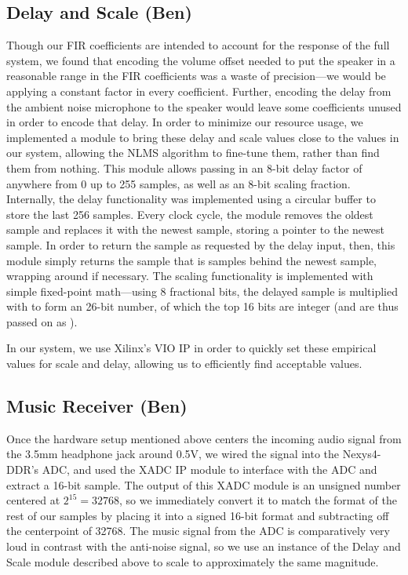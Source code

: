 \documentclass{fpgairpods}
\begin{document}
\subsection{Delay and Scale (Ben)}
Though our FIR coefficients are intended to account for the response of the full system, we found that encoding the volume offset needed to put the speaker in a reasonable range in the FIR coefficients was a waste of precision---we would be applying a constant factor in every coefficient. Further, encoding the delay from the ambient noise microphone to the speaker would leave some coefficients unused in order to encode that delay. In order to minimize our resource usage, we implemented a module to bring these delay and scale values close to the values in our system, allowing the NLMS algorithm to fine-tune them, rather than find them from nothing. This module allows passing in an 8-bit delay factor of anywhere from 0 up to 255 samples, as well as an 8-bit scaling fraction. Internally, the delay functionality was implemented using a circular buffer to store the last 256 samples. Every clock cycle, the module removes the oldest sample and replaces it with the newest sample, storing a pointer to the newest sample. In order to return the sample as requested by the delay input, then, this module simply returns the sample that is  samples behind the newest sample, wrapping around if necessary. The scaling functionality is implemented with simple fixed-point math---using 8 fractional bits, the delayed sample is multiplied with  to form an 26-bit number, of which the top 16 bits are integer (and are thus passed on as ).

In our system, we use Xilinx's VIO IP in order to quickly set these empirical values for scale and delay, allowing us to efficiently find acceptable values.

\subsection{Music Receiver (Ben)}
Once the hardware setup mentioned above centers the incoming audio signal from the 3.5mm headphone jack around 0.5V, we wired the signal into the Nexys4-DDR's ADC, and used the XADC IP module to interface with the ADC and extract a 16-bit sample. The output of this XADC module is an unsigned number centered at $2^{15} = 32768$, so we immediately convert it to match the format of the rest of our samples by placing it into a signed 16-bit format and subtracting off the centerpoint of 32768. The music signal from the ADC is comparatively very loud in contrast with the anti-noise signal, so we use an instance of the Delay and Scale module described above to scale to approximately the same magnitude.
\end{document}
